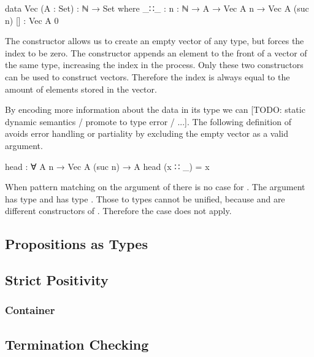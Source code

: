 \documentclass[10pt,a4paper,twoside]{report}
\begin{document}
\begin{code}
data Vec (A : Set) : ℕ → Set where
  _∷_  : {n : ℕ} → A → Vec A n → Vec A (suc n)
  []   : Vec A 0
\end{code}

The \AgdaInductiveConstructor{[]} constructor allows us to create an empty
vector of any type, but forces the index to be zero.
The  constructor appends an element to the front
of a vector of the same type, increasing the index in the process.
Only these two constructors can be used to construct vectors.
Therefore the index is always equal to the amount of elements stored in the
vector.

By encoding more information about the data in its type we can  [TODO: static
dynamic semantics / promote to type error / ...].
The following definition of  avoids error handling or
partiality by excluding the empty vector as a valid argument.

\begin{code}
head : ∀ {A n} → Vec A (suc n) → A
head (x ∷ _) = x
\end{code}

When pattern matching on the argument of  there is no case
for \AgdaInductiveConstructor{[]}.
The argument has type  and
\AgdaInductiveConstructor{[]} has type .
Those to types cannot be unified, because  and
 are different constructors of .
Therefore the  case does not apply.

\subsection{Propositions as Types}

\cite{DBLP:journals/cacm/Wadler15}

\subsection{Strict Positivity}



\subsubsection{Container}

\subsection{Termination Checking}
\end{document}
